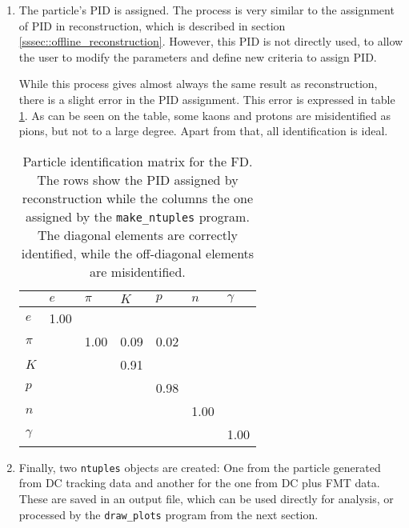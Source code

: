 \begin{enumerate}
        \item
            The particle's PID is assigned.
            The process is very similar to the assignment of PID in reconstruction, which is described in section \ref{sssec::offline_reconstruction}.
            However, this PID is not directly used, to allow the user to modify the parameters and define new criteria to assign PID.

            While this process gives almost always the same result as reconstruction, there is a slight error in the PID assignment.
            This error is expressed in table \ref{tab::mpid}.
            As can be seen on the table, some kaons and protons are misidentified as pions, but not to a large degree.
            Apart from that, all identification is ideal.

            \begin{table}
                \caption{Particle identification matrix for the FD.
                The rows show the PID assigned by reconstruction while the columns the one assigned by the \texttt{make\_ntuples} program.
                The diagonal elements are correctly identified, while the off-diagonal elements are misidentified.}

                \begin{center}
                    \begin{tabularx}{240pt}{X|llllll}
                        \cline{2-7}
                                 & $e$      & $\pi$ & $K$  & $p$  & $n$  & $\gamma$ \\
                        \hline
                        $e$      & 1.00     &       &      &      &      &          \\
                        $\pi$    &          & 1.00  & 0.09 & 0.02 &      &          \\
                        $K$      &          &       & 0.91 &      &      &          \\
                        $p$      &          &       &      & 0.98 &      &          \\
                        $n$      &          &       &      &      & 1.00 &          \\
                        $\gamma$ &          &       &      &      &      & 1.00     \\
                        \hline
                    \end{tabularx}
                \end{center}
                \label{tab::mpid}
            \end{table}

        \item
            Finally, two \texttt{ntuples} objects are created: One from the particle generated from DC tracking data and another for the one from DC plus FMT data.
            These are saved in an output file, which can be used directly for analysis, or processed by the \texttt{draw\_plots} program from the next section.
    \end{enumerate}

